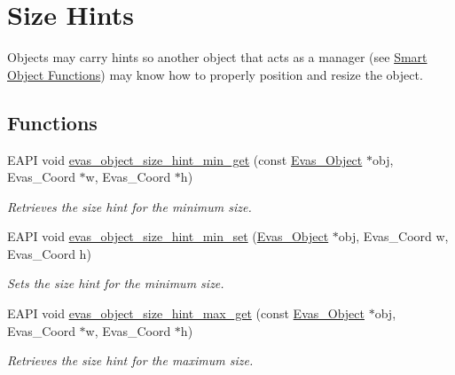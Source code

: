 \section{Size Hints}
\label{group__Evas__Object__Group__Size__Hints}


Objects may carry hints so another object that acts as a manager (see \hyperlink{group__Evas__Smart__Object__Group}{Smart Object Functions}) may know how to properly position and resize the object.  


\subsection*{Functions}
\begin{DoxyCompactItemize}
\item 
EAPI void \hyperlink{group__Evas__Object__Group__Size__Hints_ga8f1430ec1cce66ee7763fbac7927f55e}{evas\_\-object\_\-size\_\-hint\_\-min\_\-get} (const \hyperlink{group__Evas__Object__Group_ga9e19e6dd1f517a0ba437c0114d3e7c97}{Evas\_\-Object} $\ast$obj, Evas\_\-Coord $\ast$w, Evas\_\-Coord $\ast$h)
\begin{DoxyCompactList}\small\item\em Retrieves the size hint for the minimum size. \item\end{DoxyCompactList}\item 
EAPI void \hyperlink{group__Evas__Object__Group__Size__Hints_ga373fc149848dd782ac942e4b5751eb4b}{evas\_\-object\_\-size\_\-hint\_\-min\_\-set} (\hyperlink{group__Evas__Object__Group_ga9e19e6dd1f517a0ba437c0114d3e7c97}{Evas\_\-Object} $\ast$obj, Evas\_\-Coord w, Evas\_\-Coord h)
\begin{DoxyCompactList}\small\item\em Sets the size hint for the minimum size. \item\end{DoxyCompactList}\item 
EAPI void \hyperlink{group__Evas__Object__Group__Size__Hints_ga868180db80ed59bfd7ebdc3dd71bb59a}{evas\_\-object\_\-size\_\-hint\_\-max\_\-get} (const \hyperlink{group__Evas__Object__Group_ga9e19e6dd1f517a0ba437c0114d3e7c97}{Evas\_\-Object} $\ast$obj, Evas\_\-Coord $\ast$w, Evas\_\-Coord $\ast$h)
\begin{DoxyCompactList}\small\item\em Retrieves the size hint for the maximum size. \item\end{DoxyCompactList}\item 

\end{DoxyCompactItemize}
